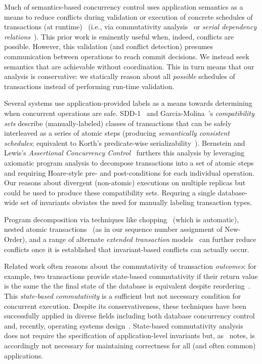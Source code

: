 Much of semantics-based concurrency control uses application semantics
as a means to reduce conflicts during validation or execution of
concrete schedules of transactions (at
runtime)~\cite{badrinath-semantics} (i.e., via commutativity
analysis~\cite{weihl-thesis} or \textit{serial dependency
  relations}~\cite{herlihy-apologizing}). This prior work is eminently
useful when, indeed, conflicts are possible. However, this validation
(and conflict detection) presumes communication between operations to
reach commit decisions. We instead seek semantics that are achievable
without coordination. This in turn means that our \iconfluence
analysis is conservative: we statically reason about all
\textit{possible} schedules of transactions instead of performing
run-time validation.

Several systems use application-provided labels as a means towards
determining when concurrent operations are safe. SDD-1~\cite{sdd1} and
Garcia-Molina~\cite{garciamolina-semantics}'s \textit{compatibility
  sets} describe (manually-labeled) classes of transactions that can
be safely interleaved as a series of atomic steps (producing
\textit{semantically consistent schedules}; equivalent to Korth's
predicate-wise
serializability~\cite{korth-serializability}). Bernstein and Lewis's
\textit{Assertional Concurrency Control}~\cite{decomp-semantics}
furthers this analysis by leveraging axiomatic program analysis to
decompose transactions into a set of atomic steps and requiring
Hoare-style pre- and post-conditions for each individual
operation. Our \iconfluence reasons about divergent (non-atomic)
executions on multiple replicas but could be used to produce these
compatibility sets. Requring a single database-wide set of invariants
obviates the need for manually labeling transaction types.

Program decomposition via techniques like chopping~\cite{chopping}
(which is automatic), nested atomic
transactions~\cite{atomictransactions} (as in our sequence number
assignment of New-Order), and a range of alternate \textit{extended
  transaction} models~\cite{acta} can further reduce conflicts once it
is established that invariant-based conflicts can actually occur.

 Related work often reasons about
the commutativity of transaction \textit{outcomes}: for example, two
transactions provide state-based commutativity if their return value
is the same the the final state of the database is equivalent despite
reordering~\cite{weihl-data,weihl-thesis}. This \textit{state-based
  commutativity} is a sufficient but not necessary condition for
concurrent execution. Despite its conservativeness, these techniques
have been successfully applied in diverse fields including both
database concurrency control and, recently, operating systems
design~\cite{kohler-commutativity}. State-based commutativity analysis
does not require the specification of application-level invariants
but, as~\cite{kohler-commutativity} notes, is accordingly not
necessary for maintaining correctness for all (and often common)
applications.

